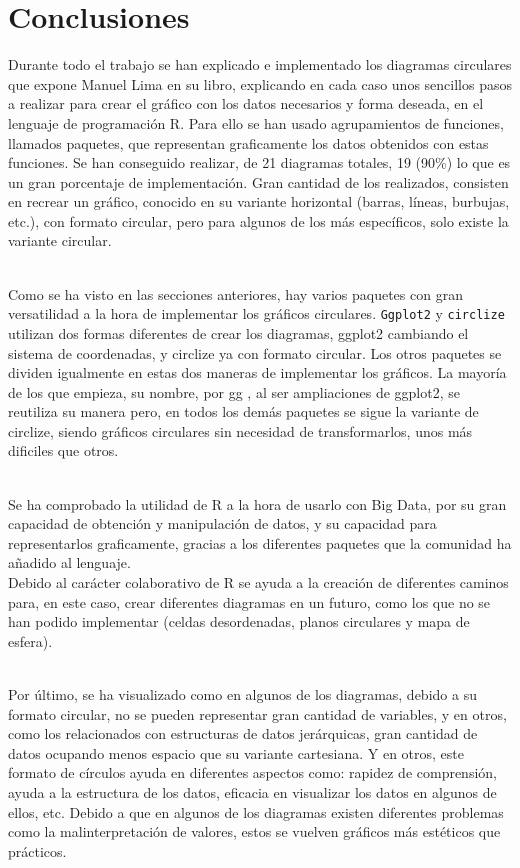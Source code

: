 \documentclass{article}\usepackage[]{graphicx}\usepackage[]{color}
\begin{document}
\section{Conclusiones}
Durante todo el trabajo se han explicado e implementado los diagramas circulares que expone Manuel Lima en su libro\cite{Circle}, explicando en cada caso unos sencillos pasos a realizar para crear el gr\'afico con los datos necesarios y forma deseada, en el lenguaje de programaci\'on R. Para ello se han usado agrupamientos de funciones, llamados paquetes, que representan graficamente los datos obtenidos con estas funciones.
Se han conseguido realizar, de 21 diagramas totales, 19 (90\%) lo que es un gran porcentaje de implementaci\'on. Gran cantidad de los realizados, consisten en recrear un gr\'afico, conocido en su variante horizontal (barras, l\'ineas, burbujas, etc.), con formato circular, pero para algunos de los m\'as espec\'ificos, solo existe la variante circular. ~\\~\par
Como se ha visto en las secciones anteriores, hay varios paquetes con gran versatilidad a la hora de implementar los gr\'aficos circulares. \texttt{Ggplot2} y \texttt{circlize} utilizan dos formas diferentes de crear los diagramas, ggplot2 cambiando el sistema de coordenadas, y circlize ya con formato circular. Los otros paquetes se dividen igualmente en estas dos maneras de implementar los gr\'aficos. La mayor\'ia de los que empieza, su nombre, por gg , al ser ampliaciones de ggplot2, se reutiliza su manera pero, en todos los dem\'as paquetes se sigue la variante de circlize, siendo gr\'aficos circulares sin necesidad de transformarlos, unos m\'as dificiles que otros.~\\~\par
Se ha comprobado la utilidad de R a la hora de usarlo con Big Data, por su gran capacidad de obtenci\'on y manipulaci\'on de datos, y su capacidad para representarlos graficamente, gracias a los diferentes paquetes que la comunidad ha a\~nadido al lenguaje.~\\ Debido al car\'acter colaborativo de R se ayuda a la creaci\'on de diferentes caminos para, en este caso, crear diferentes diagramas en un futuro, como los que no se han podido implementar (celdas desordenadas, planos circulares y mapa de esfera).~\\~\par
Por \'ultimo, se ha visualizado como en algunos de los diagramas, debido a su formato circular, no se pueden representar gran cantidad de variables,  y en otros, como los relacionados con estructuras de datos jer\'arquicas, gran cantidad de datos ocupando menos espacio que su variante cartesiana. Y en otros, este formato de c\'irculos ayuda en diferentes aspectos como: rapidez de comprensi\'on, ayuda a la estructura de los datos, eficacia en visualizar los datos en algunos de ellos, etc. Debido a que en algunos de los diagramas existen diferentes problemas como la malinterpretaci\'on de valores, estos se vuelven gr\'aficos m\'as est\'eticos que pr\'acticos.~\\~\par
\end{document}
